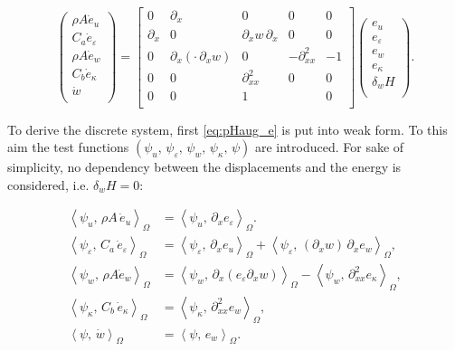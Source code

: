 \documentclass{ifacconf}
\newcommand{\inner}[3][]{\ensuremath{\left\langle #2, \, #3 \right\rangle_{#1}}}
\begin{document}
\begin{equation}\label{eq:pHaug_e}
	\begin{pmatrix}
		\rho A \dot{e}_u \\
		C_a \dot{e}_\varepsilon \\
		\rho A \dot{e}_w \\
		C_b \dot{e}_\kappa \\
		\dot{w} \\
	\end{pmatrix} = 
	\begin{bmatrix}
		0 & \partial_x & 0 & 0 & 0\\
		\partial_x & 0 & \partial_x w \, \partial_x & 0 & 0 \\
		0 & \partial_x(\cdot \, \partial_x w) & 0 & -\partial_{xx}^2 & -1 \\
		0 & 0 & \partial_{xx}^2 & 0 & 0 \\ 
		0 & 0 & 1 &  & 0 \\
	\end{bmatrix}
	\begin{pmatrix}
		e_u \\
		e_\varepsilon \\
		e_w \\
		e_\kappa \\
		\delta_w H \\
	\end{pmatrix}.
\end{equation}

To derive the discrete system, first \eqref{eq:pHaug_e} is put into weak form. To this aim the test functions $(\psi_u,\, \psi_\varepsilon,\, \psi_w,\, \psi_\kappa,\, \psi)$ are introduced. For sake of simplicity, no dependency between the displacements and the energy is considered, i.e. $\delta_w H=0$:

\begin{equation}
	\begin{aligned}
	\inner[\Omega]{\psi_u}{\rho A \, \dot{e}_u} &= \inner[\Omega]{\psi_u}{\partial_x e_\varepsilon}. \\
	\inner[\Omega]{\psi_\varepsilon}{C_a \, \dot{e}_\varepsilon} &= \inner[\Omega]{\psi_\varepsilon}{\partial_x e_u} + \inner[\Omega]{\psi_\varepsilon}{(\partial_x w) \, \partial_x e_w}, \\
	\inner[\Omega]{\psi_w}{\rho A\dot{e}_w} &= \inner[\Omega]{\psi_w}{\partial_x(e_\varepsilon \partial_x w)} - \inner[\Omega]{\psi_w}{\partial^2_{xx} e_\kappa}, \\
	\inner[\Omega]{\psi_\kappa}{C_b \, \dot{e}_\kappa} &= \inner[\Omega]{\psi_\kappa}{\partial^2_{xx} e_w}, \\
	\inner[\Omega]{\psi}{\dot{w}} &= \inner[\Omega]{\psi}{e_w}. \\
	\end{aligned}
\end{equation}
\end{document}
